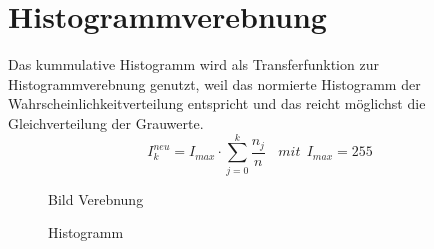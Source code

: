 \documentclass[12pt]{article}
\begin{document}
\section{Histogrammverebnung}
Das kummulative Histogramm wird als Transferfunktion zur Histogrammverebnung genutzt, weil das normierte Histogramm der Wahrscheinlichkeitverteilung entspricht und das reicht möglichst die Gleichverteilung der Grauwerte.
\begin{equation*}
I_{k}^{neu}=I_{max} \cdot \sum\limits_{j=0}^k \frac{n_j}{n}\ \ \ \ mit \ \  I_{max}=255
\end{equation*}
\begin{figure}[ht]\centering
	\caption{Bild Verebnung}
\end{figure}
\begin{figure}[ht]\centering
	\caption{Histogramm}
\end{figure}
\newpage
\end{document}
